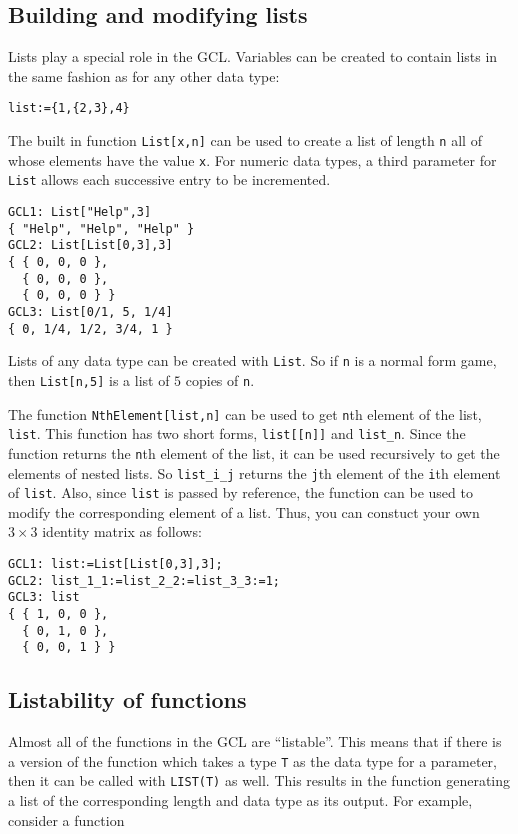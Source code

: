 \subsection{Building and modifying lists}
Lists play a special role in the GCL.  Variables can be created to
contain lists in the same fashion as for any other data type:  

\begin{verbatim}
list:={1,{2,3},4}
\end{verbatim}

The built in function \verb+List[x,n]+ can be used to create a list of
length \verb+n+ all of whose elements have the value \verb+x+.  For
numeric data types, a third parameter for \verb+List+ allows each
successive entry to be incremented.

\begin{verbatim}
GCL1: List["Help",3]
{ "Help", "Help", "Help" }
GCL2: List[List[0,3],3]
{ { 0, 0, 0 },
  { 0, 0, 0 },
  { 0, 0, 0 } }
GCL3: List[0/1, 5, 1/4]
{ 0, 1/4, 1/2, 3/4, 1 }
\end{verbatim}

\noindent
Lists of any data type can be created with \verb+List+.  So if
\verb+n+ is a normal form game, then \verb+List[n,5]+ is a list of $5$
copies of \verb+n+.

The function \verb+NthElement[list,n]+ can be used to get \verb+n+th
element of the list, \verb+list+.  This function has two short forms,
\verb+list[[n]]+ and \verb+list_n+.  Since the function returns the
\verb+n+th element of the list, it can be used recursively to get the
elements of nested lists.  So \verb+list_i_j+ returns the \verb+j+th
element of the \verb+i+th element of \verb+list+.  Also, since
\verb+list+ is passed by reference, the function can be used to modify
the corresponding element of a list.  Thus, you can constuct your own
$3\times 3$ identity matrix as follows:

\begin{verbatim}
GCL1: list:=List[List[0,3],3];
GCL2: list_1_1:=list_2_2:=list_3_3:=1;
GCL3: list
{ { 1, 0, 0 },
  { 0, 1, 0 },
  { 0, 0, 1 } }
\end{verbatim}

\subsection{Listability of functions}

Almost all of the functions in the GCL are ``listable''.  This means
that if there is a version of the function which takes a type \verb+T+
as the data type for a parameter, then it can be called with
\verb+LIST(T)+ as well.  This results in the function generating a
list of the corresponding length and data type as its output.  For
example, consider a function

